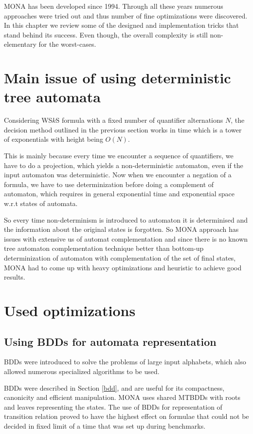 \textsc{MONA} has been developed since 1994. Through all these years numerous
approaches were tried out and thus number of fine optimizations were discovered.
In this chapter we review some of the designed and implementation tricks that
stand behind its success. Even though, the overall complexity is still
non-elementary for the worst-cases.

\section{Main issue of using deterministic tree automata}

Considering WS$k$S formula with a fixed number of quantifier alternations $N$,
the decision method outlined in the previous section works in time which is a
tower of exponentials with height being $O(N)$.

This is mainly because every time we encounter a sequence of quantifiers, we
have to do a projection, which yields a non-deterministic automaton, even if the
input automaton was deterministic. Now when we encounter a negation of a
formula, we have to use determinization before doing a complement of automaton,
which requires in general exponential time and exponential space w.r.t states of
automata.

So every time non-determinism is introduced to automaton it is determinised and
the information about the original states is forgotten. So \textsc{MONA}
approach has issues with extensive us of automat complementation and since there
is no known tree automaton complementation technique better than bottom-up
determinization of automaton with complementation of the set of final states,
\textsc{MONA} had to come up with heavy optimizations and heuristic to achieve
good results.

 \section{Used optimizations}\label{monasecrets}
\subsection{Using BDDs for automata representation}\label{monabdd}
BDDs were introduced to solve the problems of large input alphabets, which also
allowed numerous specialized algorithms to be used.

BDDs were described in Section \ref{bdd}, and are useful for its compactness,
canonicity and efficient manipulation. \textsc{MONA} uses shared MTBDDs with
roots and leaves representing the states. The use of BDDs for representation  of
transition relation proved to have the highest effect on formulae that could not
be decided in fixed limit of a time that was set up during benchmarks.


